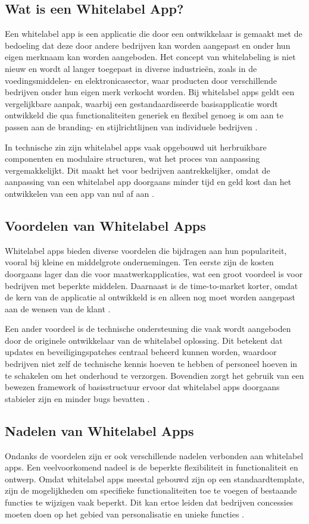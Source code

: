 \subsection{Wat is een Whitelabel App?}
Een whitelabel app is een applicatie die door een ontwikkelaar is gemaakt met de bedoeling dat deze door andere bedrijven kan worden aangepast en onder hun eigen merknaam kan worden aangeboden.
Het concept van whitelabeling is niet nieuw en wordt al langer toegepast in diverse industrieën, zoals in de voedingsmiddelen- en elektronicasector, waar producten door verschillende bedrijven onder hun eigen merk verkocht worden. 
Bij whitelabel apps geldt een vergelijkbare aanpak, waarbij een gestandaardiseerde basisapplicatie wordt ontwikkeld die qua functionaliteiten generiek en flexibel genoeg is om aan te passen aan de branding- en stijlrichtlijnen van individuele bedrijven \autocite{Candelario2024}.

In technische zin zijn whitelabel apps vaak opgebouwd uit herbruikbare componenten en modulaire structuren, wat het proces van aanpassing vergemakkelijkt. 
Dit maakt het voor bedrijven aantrekkelijker, omdat de aanpassing van een whitelabel app doorgaans minder tijd en geld kost dan het ontwikkelen van een app van nul af aan \autocite{Vendesta2019}.

\subsection{Voordelen van Whitelabel Apps}
Whitelabel apps bieden diverse voordelen die bijdragen aan hun populariteit, vooral bij kleine en middelgrote ondernemingen. 
Ten eerste zijn de kosten doorgaans lager dan die voor maatwerkapplicaties, wat een groot voordeel is voor bedrijven met beperkte middelen. 
Daarnaast is de time-to-market korter, omdat de kern van de applicatie al ontwikkeld is en alleen nog moet worden aangepast aan de wensen van de klant \autocite{Struk2023}.

Een ander voordeel is de technische ondersteuning die vaak wordt aangeboden door de originele ontwikkelaar van de whitelabel oplossing. 
Dit betekent dat updates en beveiligingspatches centraal beheerd kunnen worden, waardoor bedrijven niet zelf de technische kennis hoeven te hebben of personeel hoeven in te schakelen om het onderhoud te verzorgen. 
Bovendien zorgt het gebruik van een bewezen framework of basisstructuur ervoor dat whitelabel apps doorgaans stabieler zijn en minder bugs bevatten \autocite{Candelario2024}.

\subsection{Nadelen van Whitelabel Apps}
Ondanks de voordelen zijn er ook verschillende nadelen verbonden aan whitelabel apps. 
Een veelvoorkomend nadeel is de beperkte flexibiliteit in functionaliteit en ontwerp. 
Omdat whitelabel apps meestal gebouwd zijn op een standaardtemplate, zijn de mogelijkheden om specifieke functionaliteiten toe te voegen of bestaande functies te wijzigen vaak beperkt. 
Dit kan ertoe leiden dat bedrijven concessies moeten doen op het gebied van personalisatie en unieke functies \autocite{Vendesta2023}.


